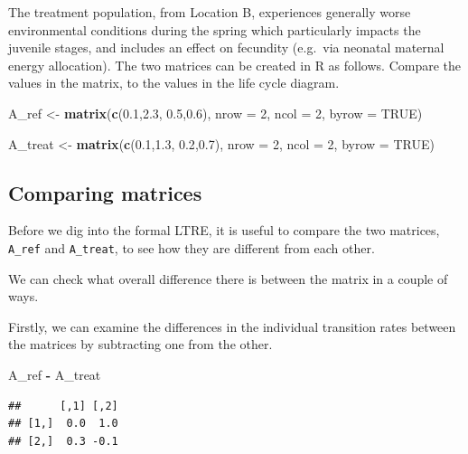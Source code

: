 \documentclass[
  a4paper]{book}
\newenvironment{Shaded}{\begin{snugshade}}{\end{snugshade}}
\newcommand{\AttributeTok}[1]{\textcolor[rgb]{0.13,0.29,0.53}{#1}}
\newcommand{\ConstantTok}[1]{\textcolor[rgb]{0.56,0.35,0.01}{#1}}
\newcommand{\DecValTok}[1]{\textcolor[rgb]{0.00,0.00,0.81}{#1}}
\newcommand{\FloatTok}[1]{\textcolor[rgb]{0.00,0.00,0.81}{#1}}
\newcommand{\FunctionTok}[1]{\textcolor[rgb]{0.13,0.29,0.53}{\textbf{#1}}}
\newcommand{\NormalTok}[1]{#1}
\newcommand{\OtherTok}[1]{\textcolor[rgb]{0.56,0.35,0.01}{#1}}
\newcommand{\SpecialCharTok}[1]{\textcolor[rgb]{0.81,0.36,0.00}{\textbf{#1}}}
\begin{document}
The treatment population, from Location B, experiences generally worse environmental conditions during the spring which particularly impacts the juvenile stages, and includes an effect on fecundity (e.g.~via neonatal maternal energy allocation). The two matrices can be created in R as follows. Compare the values in the matrix, to the values in the life cycle diagram.

\begin{Shaded}
\begin{Highlighting}[]
\NormalTok{A\_ref }\OtherTok{\textless{}{-}} \FunctionTok{matrix}\NormalTok{(}\FunctionTok{c}\NormalTok{(}\FloatTok{0.1}\NormalTok{,}\FloatTok{2.3}\NormalTok{,}
                  \FloatTok{0.5}\NormalTok{,}\FloatTok{0.6}\NormalTok{), }\AttributeTok{nrow =} \DecValTok{2}\NormalTok{, }\AttributeTok{ncol =} \DecValTok{2}\NormalTok{, }\AttributeTok{byrow =} \ConstantTok{TRUE}\NormalTok{)}

\NormalTok{A\_treat }\OtherTok{\textless{}{-}} \FunctionTok{matrix}\NormalTok{(}\FunctionTok{c}\NormalTok{(}\FloatTok{0.1}\NormalTok{,}\FloatTok{1.3}\NormalTok{,}
                    \FloatTok{0.2}\NormalTok{,}\FloatTok{0.7}\NormalTok{), }\AttributeTok{nrow =} \DecValTok{2}\NormalTok{, }\AttributeTok{ncol =} \DecValTok{2}\NormalTok{, }\AttributeTok{byrow =} \ConstantTok{TRUE}\NormalTok{)}
\end{Highlighting}
\end{Shaded}

\subsection{Comparing matrices}\label{comparing-matrices}

Before we dig into the formal LTRE, it is useful to compare the two matrices, \texttt{A\_ref} and \texttt{A\_treat}, to see how they are different from each other.

We can check what overall difference there is between the matrix in a couple of ways.

Firstly, we can examine the differences in the individual transition rates between the matrices by subtracting one from the other.

\begin{Shaded}
\begin{Highlighting}[]
\NormalTok{A\_ref }\SpecialCharTok{{-}}\NormalTok{ A\_treat}
\end{Highlighting}
\end{Shaded}

\begin{verbatim}
##      [,1] [,2]
## [1,]  0.0  1.0
## [2,]  0.3 -0.1
\end{verbatim}
\end{document}
